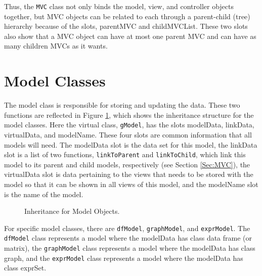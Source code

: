 \documentclass[11pt]{article}
\newcommand{\Rfunction}[1]{{\texttt{#1}}}
\newcommand{\Robject}[1]{{\texttt{#1}}}
\begin{document}
Thus, the \Robject{MVC} class not only binds the model, view, and controller
objects together, but MVC objects can be related to each through a 
parent-child (tree) hierarchy because of the slots, parentMVC and 
childMVCList. 
These two slots also show that a MVC object can have at most one parent MVC and
can have as many children MVCs as it wants. 

\section{Model Classes}\label{Sec:Model}

The model class is responsible for storing and updating the data.  These two
functions are reflected in Figure \ref{Fig:Model}, which shows the inheritance
structure for the model classes.  Here the virtual class,
\Robject{gModel}, has the slots modelData, linkData, virtualData, and
modelName.  These four slots are common information that all models will
need.  The modelData slot is the data set for this model, the linkData slot is
a list of two functions, \Rfunction{linkToParent} and \Rfunction{linkToChild},
which link this model to its parent and child models, respectively (see Section
\ref{Sec:MVC}), the virtualData slot is data pertaining to the views
that needs to be stored with the model so that it can be shown in all views of
this model, and the modelName slot is the name of the model. 

\begin{figure}[ht]
  \begin{center}
    \caption{ Inheritance for Model Objects. }
    \label{Fig:Model}
  \end{center}
\end{figure}

For specific model classes, there are \Robject{dfModel}, \Robject{graphModel},
and \Robject{exprModel}.  The \Robject{dfModel} class represents a model where
the modelData has class data frame (or matrix), the \Robject{graphModel} class
represents a model where the modelData has class graph, and the
\Robject{exprModel} class represents a model where the modelData has class
exprSet. 
\end{document}
